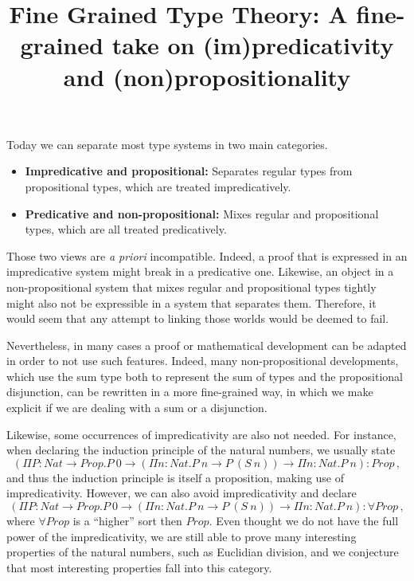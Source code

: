 \documentclass[]{template}
\title{Fine Grained Type Theory: A fine-grained take on (im)predicativity and (non)propositionality}
\begin{document}
 
\maketitle

Today we can separate most type systems in two main categories.
\begin{itemize}
\item \textbf{Impredicative and propositional:} Separates regular types from propositional types, which are treated impredicatively.
\item \textbf{Predicative and non-propositional:} Mixes regular and propositional types, which are all treated predicatively. 
\end{itemize}

Those two views are \textit{a priori} incompatible. Indeed, a proof that is expressed in an impredicative system might break in a predicative one. Likewise, an object in a non-propositional system that mixes regular and propositional types tightly might also not be expressible in a system that separates them. Therefore, it would seem that any attempt to linking those worlds would be deemed to fail.

Nevertheless, in many cases a proof or mathematical development can be adapted in order to not use such features. Indeed, many  non-propositional developments, which use the sum type both to represent the sum of types and the propositional disjunction, can be rewritten in a more fine-grained way, in which we make explicit if we are dealing with a sum or a disjunction.


Likewise, some occurrences of impredicativity are also not needed. For instance, when declaring the induction principle of the natural numbers, we usually state\[
(\Pi P : Nat \to Prop. P~0 \to (\Pi n : Nat. P~n \to P~(S~n)) \to \Pi n : Nat. P~n) : Prop
\,,\]and thus the induction principle is itself a proposition, making use of impredicativity. However, we can also avoid impredicativity and declare \[
(\Pi P : Nat \to Prop. P~0 \to (\Pi n : Nat. P~n \to P~(S~n)) \to \Pi n : Nat. P~n) : \forall Prop
\,,\] where $ \forall Prop $ is a ``higher'' sort then $ Prop $. Even thought we do not have the full power of the impredicativity, we are still able to prove many interesting properties of the natural numbers, such as Euclidian division, and we conjecture that most interesting properties fall into this category.
\end{document}
